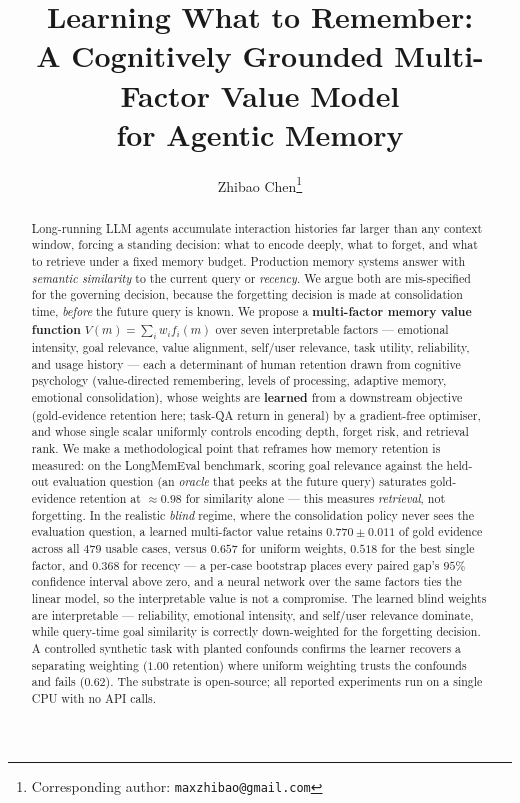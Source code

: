 \documentclass[10pt]{article}
\title{\textbf{Learning What to Remember:\\
A Cognitively Grounded Multi-Factor Value Model\\
for Agentic Memory}}
\author[1]{Zhibao Chen\thanks{Corresponding author: \texttt{maxzhibao@gmail.com}}}
\affil[1]{Huatai Securities, Nanjing, China}
\date{}
\begin{document}
\maketitle

\begin{abstract}
\noindent
Long-running LLM agents accumulate interaction histories far larger than
any context window, forcing a standing decision: what to encode deeply,
what to forget, and what to retrieve under a fixed memory budget.
Production memory systems answer with \emph{semantic similarity} to the
current query or \emph{recency}. We argue both are mis-specified for the
governing decision, because the forgetting decision is made at
consolidation time, \emph{before} the future query is known.
We propose a \textbf{multi-factor memory value function}
$V(m)=\sum_i w_i f_i(m)$ over seven interpretable factors --- emotional
intensity, goal relevance, value alignment, self/user relevance, task
utility, reliability, and usage history --- each a determinant of human
retention drawn from cognitive psychology (value-directed remembering,
levels of processing, adaptive memory, emotional consolidation), whose
weights are \textbf{learned} from a downstream objective (gold-evidence
retention here; task-QA return in general) by a gradient-free optimiser,
and whose single scalar uniformly controls encoding depth, forget risk,
and retrieval rank.
We make a methodological point that reframes how memory retention is
measured: on the LongMemEval benchmark, scoring goal relevance against
the held-out evaluation question (an \emph{oracle} that peeks at the
future query) saturates gold-evidence retention at $\approx\!0.98$ for
similarity alone --- this measures \emph{retrieval}, not forgetting.
In the realistic \emph{blind} regime, where the consolidation policy
never sees the evaluation question, a learned multi-factor value retains
$\mathbf{0.770 \pm 0.011}$ of gold evidence across all $479$ usable
cases, versus $0.657$ for uniform weights, $0.518$ for the best single
factor, and $0.368$ for recency --- a per-case bootstrap places every
paired gap's $95\%$ confidence interval above zero, and a neural network
over the same factors ties the linear model, so the interpretable value
is not a compromise.
The learned blind weights are interpretable --- reliability, emotional
intensity, and self/user relevance dominate, while query-time goal
similarity is correctly down-weighted for the forgetting decision.
A controlled synthetic task with planted confounds confirms the learner
recovers a separating weighting ($1.00$ retention) where uniform
weighting trusts the confounds and fails ($0.62$).
The substrate is open-source; all reported experiments run on a single
CPU with no API calls.
\end{abstract}


\FloatBarrier

\FloatBarrier

\FloatBarrier

\FloatBarrier

\FloatBarrier

\FloatBarrier

\FloatBarrier



\end{document}
